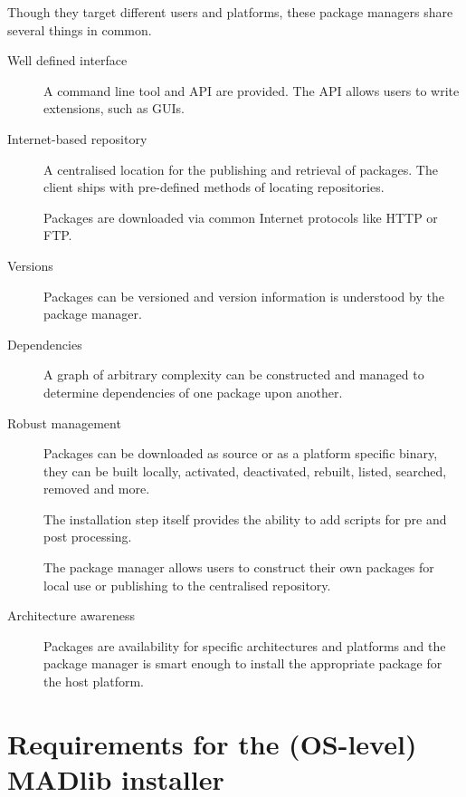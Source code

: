 \documentclass[11pt]{article}
\begin{document}
{Though they target different users and platforms, these package managers share
several things in common.

\begin{description}
	\item[Well defined interface] A command line tool and API are provided.
	The API allows users to write extensions, such as GUIs.

	\item[Internet-based repository] A centralised location for the publishing
	and retrieval of packages. The client ships with pre-defined methods of
	locating repositories.

	Packages are downloaded via common Internet protocols like HTTP or FTP.

	\item[Versions] Packages can be versioned and version information is
	understood by the package manager.

	\item[Dependencies] A graph of arbitrary complexity can be constructed and
	managed to determine dependencies of one package upon another.

	\item[Robust management] Packages can be downloaded as source or as a
	platform specific binary, they can be built locally, activated, deactivated,
	rebuilt, listed, searched, removed and more.
	
	The installation step itself provides the ability to add scripts for pre and
	post processing.

	The package manager allows users to construct their own packages for local
	use or publishing to the centralised repository.

	\item[Architecture awareness] Packages are availability for specific
	architectures and platforms and the package manager is smart enough to
	install the appropriate package for the host platform.

\end{description}

\ifx\pdfoutput\undefined %
\else
{}
\fi

\section{Requirements for the (OS-level) MADlib installer}

}
\end{document}
